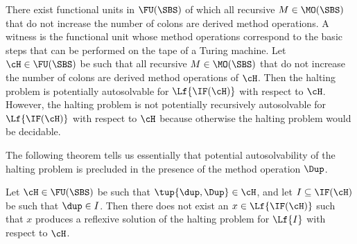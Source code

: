 \documentclass[fleqn]{llncs}
\begin{document}
There exist functional units in $\FU(\SBS)$ of which all recursive
$M \in \MO(\SBS)$ that do not increase the number of colons are derived
method operations.
A witness is the functional unit whose method operations correspond to
the basic steps that can be performed on the tape of a Turing machine.
Let $\cH \in \FU(\SBS)$ be such that all recursive $M \in \MO(\SBS)$
that do not increase the number of colons are derived method operations
of $\cH$.
Then the halting problem is potentially autosolvable for $\Lf{\IF(\cH)}$
with respect to $\cH$.
However, the halting problem is not potentially recursively autosolvable
for $\Lf{\IF(\cH)}$ with respect to $\cH$ because otherwise the halting
problem would be decidable.

The following theorem tells us essentially that potential
autosolvability of the halting problem is precluded in the presence of
the method operation $\Dup$.
\begin{theorem}
\label{theorem-non-autosolv}
Let $\cH \in \FU(\SBS)$ be such that $\tup{\dup,\Dup} \in \cH$, and
let $I \subseteq \IF(\cH)$ be such that $\dup \in I$.
Then there does not exist an $x \in \Lf{\IF(\cH)}$ such that $x$
produces a reflexive solution of the halting problem for $\Lf{I}$ with
respect to $\cH$.
\end{theorem}
\end{document}
